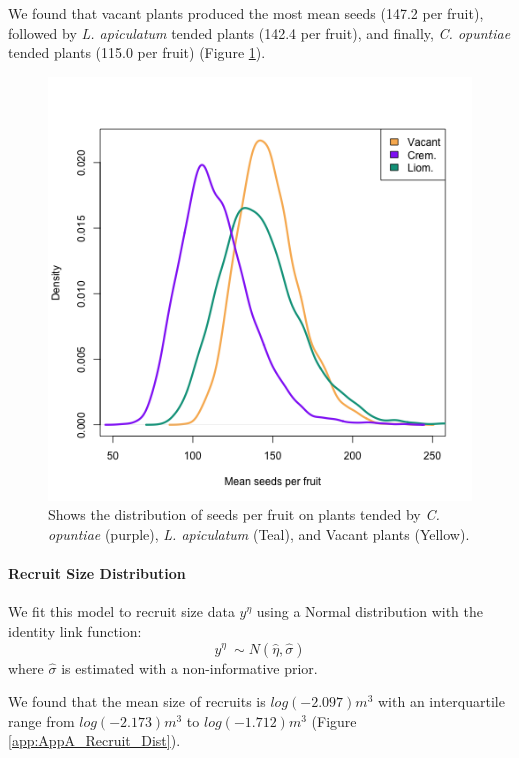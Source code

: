 \documentclass[11pt]{article}
\begin{document}
We found that vacant plants produced the most mean seeds (147.2 per fruit), followed by \textit{L. apiculatum} tended plants (142.4 per fruit), and finally, \textit{C. opuntiae} tended plants (115.0 per fruit) (Figure \ref{app:AppA_Seeds_Per_Fruit}).

\begin{figure}
	\includegraphics[width=0.91\linewidth]{Figures/Seeds_Per_Fruit.png}
	\caption{Shows the distribution of seeds per fruit on plants tended by \textit{C. opuntiae} (purple), \textit{L. apiculatum} (Teal), and Vacant plants (Yellow). }
	\label{app:AppA_Seeds_Per_Fruit}
\end{figure}

\paragraph{Recruit Size Distribution}
We fit this model to recruit size data $y^{\eta}$ using a Normal distribution with the identity link function: 
$$y^{\eta} ~\sim N(\hat{\eta},\hat{\sigma})$$
where $\hat{\sigma}$ is estimated with a non-informative prior. 

We found that the mean size of recruits is $log(-2.097) m^3$ with an interquartile range from $log(-2.173) m^3$ to $log(-1.712) m^3$ (Figure \ref{app:AppA_Recruit_Dist}).
\end{document}
